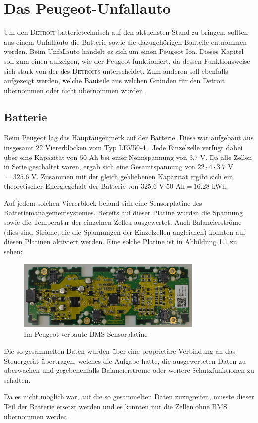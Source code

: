 \chapter{Das Peugeot-Unfallauto}
Um den \textsc{Detroit} batterietechnisch auf den aktuellsten Stand zu bringen, sollten aus einem Unfallauto die Batterie sowie die dazugehörigen Bauteile entnommen werden. Beim Unfallauto handelt es sich um einen Peugeot Ion. Dieses Kapitel soll zum einen aufzeigen, wie der Peugeot funktioniert, da dessen Funktionsweise sich stark von der des \textsc{Detroits} unterscheidet. Zum anderen soll ebenfalls aufgezeigt werden, welche Bauteile aus welchen Gründen für den {Detroit} übernommen oder nicht übernommen wurden.

\section{Batterie}
Beim Peugeot lag das Hauptaugenmerk auf der Batterie. Diese war aufgebaut aus insgesamt 22 Viererblöcken vom Typ LEV50-4 \cite{lev50}. Jede Einzelzelle verfügt dabei über eine Kapazität von $50$ Ah bei einer Nennspannung von $3.7$ V. Da alle Zellen in Serie geschaltet waren, ergab sich eine Gesamtspannung von $22\cdot 4\cdot 3.7$ V$=325.6$ V. Zusammen mit der gleich gebliebenen Kapazität ergibt sich ein theoretischer Energiegehalt der Batterie von $325.6$ V$\cdot50$ Ah$=16.28$ kWh.

Auf jedem solchen Viererblock befand sich eine Sensorplatine des Batteriemanagementsystemes. Bereits auf dieser Platine wurden die Spannung sowie die Temperatur der einzelnen Zellen ausgewertet. Auch Balancierströme (dies sind Ströme, die die Spannungen der Einzelzellen angleichen) konnten auf diesen Platinen aktiviert werden. Eine solche Platine ist in Abbildung \ref{fig:BMS_Alt} zu sehen:

\begin{figure}[h!]
	\centering
		\includegraphics[width=0.80\textwidth]{images/BMS_Alt.JPG}
	\caption{Im Peugeot verbaute BMS-Sensorplatine}
	\label{fig:BMS_Alt}
\end{figure}

Die so gesammelten Daten wurden über eine proprietäre Verbindung an das Steuergerät übertragen, welches die Aufgabe hatte, die ausgewerteten Daten zu überwachen und gegebenenfalls Balancierströme oder weitere Schutzfunktionen zu schalten.

Da es nicht möglich war, auf die so gesammelten Daten zuzugreifen, musste dieser Teil der Batterie ersetzt werden und es konnten nur die Zellen ohne BMS übernommen werden.


\newpage